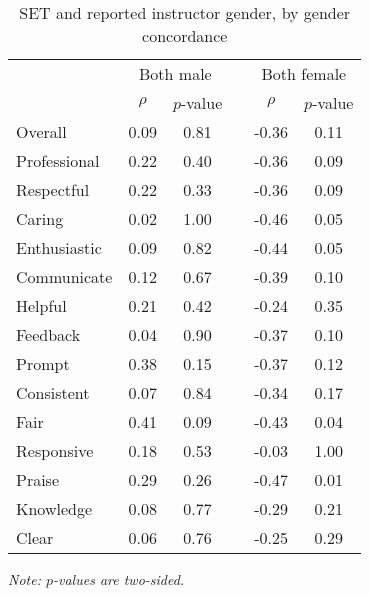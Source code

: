 \documentclass[12pt]{article}
\newcommand{\todo}[1]{{\color{red}{TO DO: \sc #1}}}
\begin{document}
\todo{For consistency, I think we should report differences in means rather than $\rho$.}
\begin{table}[htbp]
  \centering
  \footnotesize 
  \caption{SET and reported instructor gender, by gender concordance}
    \begin{tabular}{lccccc}
    \toprule 
          & \multicolumn{2}{c}{Both male}  &  & \multicolumn{2}{c}{Both female} \\
                          & $\rho$  &  $p$-value &  & $\rho$  & $p$-value    \\
                          
   \midrule
    Overall &                0.09       & 0.81 & & -0.36    & 0.11   \\
    Professional &           0.22       & 0.40 & & -0.36    & 0.09   \\
    Respectful			   & 0.22       & 0.33 & & -0.36    & 0.09   \\
    Caring &                 0.02       & 1.00 & & -0.46    & 0.05  \\
    Enthusiastic   &         0.09       & 0.82 & & -0.44    & 0.05   \\
    Communicate        &     0.12       & 0.67 & & -0.39    & 0.10  \\
    Helpful   &              0.21       & 0.42 & & -0.24    & 0.35   \\
    Feedback   &             0.04       & 0.90 & & -0.37    & 0.10   \\
    Prompt    &              0.38       & 0.15 & & -0.37    & 0.12   \\
    Consistent   &           0.07       & 0.84 & & -0.34    & 0.17   \\
    Fair   &                 0.41       & 0.09 & & -0.43    & 0.04  \\
    Responsive   &           0.18       & 0.53 & & -0.03    & 1.00  \\
    Praise    &              0.29       & 0.26 & & -0.47    & 0.01  \\
    Knowledge   &            0.08       & 0.77 & & -0.29    & 0.21  \\
    Clear   &                0.06       & 0.76 & & -0.25    & 0.29  \\
    \bottomrule
    \end{tabular}%
 \label{tab:macnell2}%

  \textit{Note: $p$-values are two-sided.}
\end{table}%
\normalsize
\end{document}

